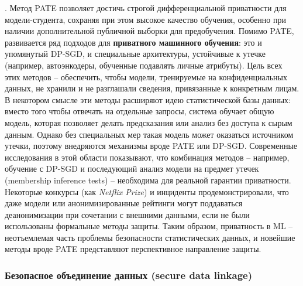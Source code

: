 \autocite{habr-com}
. Метод PATE позволяет достичь строгой дифференциальной приватности для модели-студента, сохраняя при этом высокое качество обучения, особенно при наличии дополнительной публичной выборки для предобучения. Помимо PATE, развивается ряд подходов для \textbf{приватного машинного обучения}: это и упомянутый DP-SGD, и специальные архитектуры, устойчивые к утечке (например, автоэнкодеры, обученные подавлять личные атрибуты). Цель всех этих методов – обеспечить, чтобы модели, тренируемые на конфиденциальных данных, не хранили и не разглашали сведения, привязанные к конкретным лицам. В некотором смысле эти методы расширяют идею статистической базы данных: вместо того чтобы отвечать на отдельные запросы, система обучает общую модель, которая позволяет делать предсказания или анализ без доступа к сырым данным. Однако без специальных мер такая модель может оказаться источником утечки, поэтому внедряются механизмы вроде PATE или DP-SGD. Современные исследования в этой области показывают, что комбинация методов – например, обучение с DP-SGD и последующий анализ модели на предмет утечек (membership inference tests) – необходима для реальной гарантии приватности. Некоторые конкурсы (как \textit{Netflix Prize}) и инциденты продемонстрировали, что даже модели или анонимизированные рейтинги могут поддаваться деанонимизации при сочетании с внешними данными, если не были использованы формальные методы защиты. Таким образом, приватность в ML – неотъемлемая часть проблемы безопасности статистических данных, и новейшие методы вроде PATE представляют перспективное направление защиты. \subsubsection{Безопасное объединение данных (secure data linkage)}
